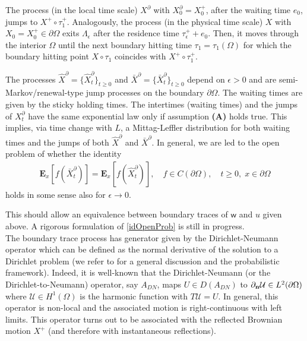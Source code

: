 \documentclass[11pt,a4paper]{article}
\begin{document}
{\begin{itemize}
\begin{minipage}{0.85\textwidth}
\end{minipage}
\end{itemize}
The process (in the local time scale) $X^\partial$ with $X^\partial_0=X^+_0$, after the waiting time $e_0$, jumps to $X^+ \circ \tau^+_1$. Analogously, the process (in the physical time scale) $X$ with $X_0=X^+_0 \in \partial \Omega$ exits $\Lambda_\epsilon$ after the residence time $\tau^+_\epsilon + e_0$. Then, it moves through the interior $\Omega$ until the next boundary hitting time $\tau_1=\tau_1(\Omega)$ for which the boundary hitting point $X \circ \tau_1$ coincides with $X^+ \circ \tau^+_1$.
 
The processes $\hat{X}^\partial = \{\hat{X}^\partial_t\}_{t\geq 0}$ and $\bar{X}^\partial = \{\bar{X}^\partial_t\}_{t\geq 0}$ depend on $\epsilon>0$ and are semi-Markov/renewal-type jump processes on the boundary $\partial \Omega$. The waiting times are given by the sticky holding times. The intertimes (waiting times) and the jumps of $X^\partial_t$ have the same exponential law only if assumption {\bf (A)} holds true. This implies, via time change with $L$, a Mittag-Leffler distribution for both waiting times and the jumps of both $\hat{X}^\partial$ and $\bar{X}^\partial$. In general, we are led to the open problem of whether the identity
\begin{align}
\mathbf{E}_x[f(\bar{X}^\partial_t)] = \mathbf{E}_x[f(\hat{X}^\partial_t)], \quad f\in C(\partial \Omega), \quad t\geq 0, \; x \in \partial \Omega
\label{idOpenProb}
\end{align}
holds in some sense also for $\epsilon \to 0$.} This should allow an equivalence between boundary traces of $\mathsf{w}$ and $u$ given above. A rigorous formulation of \eqref{idOpenProb} is still in progress. \\

The boundary trace process has generator given by the Dirichlet-Neumann operator which can be defined as the normal derivative of the solution to a Dirichlet problem (we refer to \cite{HSU86} for a general discussion and the probabilistic framework). Indeed, it is well-known that the Dirichlet-Neumann (or the Dirichlet-to-Neumann) operator, say $A_{DN}$, maps $U \in D(A_{DN})$ to $\partial_{\bf n} \mathcal{U} \in L^2(\partial \Omega)$ where $\mathcal{U} \in H^1(\Omega)$ is the harmonic function with $T \mathcal{U}=U$. In general, this operator is non-local and the associated motion is right-continuous with left limits. This operator turns out to be associated with the reflected Brownian motion $X^+$ (and therefore with instantaneous reflections).
\end{document}
